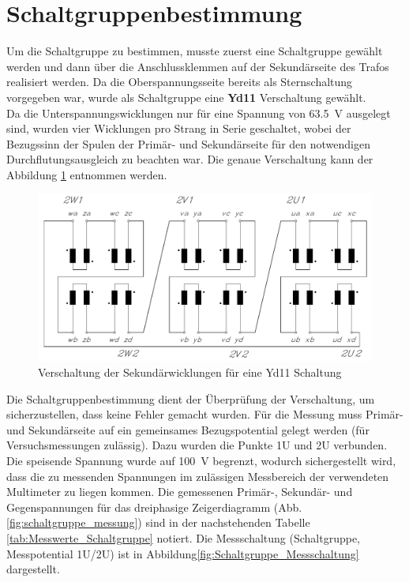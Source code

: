\section{Schaltgruppenbestimmung}\label{sec:3}
Um die Schaltgruppe zu bestimmen, musste zuerst eine Schaltgruppe gewählt werden und dann über die Anschlussklemmen auf der Sekundärseite des Trafos realisiert werden. Da die Oberspannungsseite bereits als Sternschaltung vorgegeben war, wurde als Schaltgruppe eine \textbf{Yd11} Verschaltung gewählt.\\
Da die Unterspannungswicklungen nur für eine Spannung von \SI{63.5}{\volt} ausgelegt sind, wurden vier Wicklungen pro Strang in Serie geschaltet, wobei der Bezugssinn der Spulen der Primär- und Sekundärseite für den notwendigen Durchflutungsausgleich zu beachten war. Die genaue Verschaltung kann der Abbildung \ref{fig:Verschaltung_Sekundaerseite} entnommen werden.
\begin{figure}[htb]
    \centering
    \includegraphics[width=1.0\textwidth, angle=0]{3/images/Schaltgruppe.pdf}
    \caption{Verschaltung der Sekundärwicklungen für eine Yd11 Schaltung}
    \label{fig:Verschaltung_Sekundaerseite}
\end{figure}
Die Schaltgruppenbestimmung dient der Überprüfung der Verschaltung, um sicherzustellen, dass keine Fehler gemacht wurden. Für die Messung muss Primär- und Sekundärseite auf ein gemeinsames Bezugspotential gelegt werden (für Versuchsmessungen zulässig). Dazu wurden die Punkte 1U und 2U verbunden. Die speisende Spannung wurde auf \SI{100}{\volt} begrenzt, wodurch sichergestellt wird, dass die zu messenden Spannungen im zulässigen Messbereich der verwendeten Multimeter zu liegen kommen. Die gemessenen Primär-, Sekundär- und Gegenspannungen für das dreiphasige Zeigerdiagramm (Abb. \ref{fig:schaltgruppe_messung}) sind in der nachstehenden Tabelle \ref{tab:Messwerte_Schaltgruppe} notiert. Die Messschaltung (Schaltgruppe, Messpotential 1U/2U) ist in Abbildung\;\ref{fig:Schaltgruppe_Messschaltung} dargestellt.
